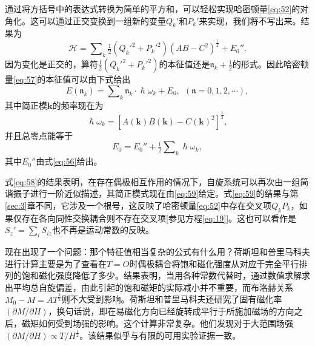\documentclass{article}
\begin{document}
通过将方括号中的表达式转换为简单的平方和，可以轻松实现哈密顿量\eqref{eq:52}的对角化。这可以通过正交变换到一组新的变量$Q_k'$和$P_k'$来实现，我们将不写出来。结果为
\begin{equation} \label{eq:57}
\mathcal{H}=\sum\nolimits_k\tfrac{1}{2}(Q_k'^2+P_k'^2)(AB-C^2)^{\frac{1}{2}}+E_0''.
\end{equation}
因为变化是正交的，算符$\tfrac{1}{2}(Q_k'^2+P_k'^2)$的本征值还是$\mathfrak{n}_k+\tfrac{1}{2}$的形式。因此哈密顿量\eqref{eq:57}的本征值可以由下式给出
\begin{equation} \label{eq:58}
E(\mathfrak{n}_k)=\sum\nolimits_k\mathfrak{n}_k\cdot\hslash\omega_k+E_0,~~(\mathfrak{n}=0,1,2,\cdots),
\end{equation}
其中简正模$\mathbf{k}$的频率现在为
\begin{equation} \label{eq:59}
\hslash\omega_k=[A(\mathbf{k})B(\mathbf{k})-C(\mathbf{k})^2]^{\frac{1}{2}},
\end{equation}
并且总零点能等于
\begin{equation} \label{eq:60}
E_0=E_0''+\tfrac{1}{2}\sum\nolimits_k\hslash\omega_k,
\end{equation}
其中$E_0''$由式\eqref{eq:56}给出。

式\eqref{eq:58}的结果表明，在存在偶极相互作用的情况下，自旋系统可以再次由一组简谐振子进行一阶近似描述，其简正模式现在由\eqref{eq:59}给定。式\eqref{eq:59}的结果与第\ref{sec:3}章不同，它涉及一个根号，这反映了哈密顿量\eqref{eq:52}中存在交叉项$Q_kP_k$，如果仅存在各向同性交换耦合则不存在交叉项[参见方程\eqref{eq:19}]。这也可以看作是$S_z'=\sum_i S_{iz}$也不再是运动常数的反映。

现在出现了一个问题：那个特征值相当复杂的公式有什么用？荷斯坦和普里马科夫进行计算主要是为了查看在$T=O$时偶极耦合将饱和磁化强度从对应于完全平行排列的饱和磁化强度降低了多少。结果表明，当用各种常数代替时，通过数值求解求出平均总自旋偏差，由此引起的饱和磁矩的实际减小并不重要，而布洛赫关系$M_0-M=AT^\frac{3}{2}$则不大受到影响。荷斯坦和普里马科夫还研究了固有磁化率$(\partial M/\partial H)$，换句话说，即在易磁化方向已经旋转成平行于所施加磁场的方向之后，磁矩如何受到场强的影响。这个计算非常复杂。他们发现对于大范围场强$(\partial M/\partial H)\propto T/H^\frac{1}{2}$。该结果似乎与有限的可用实验证据一致。
\end{document}
